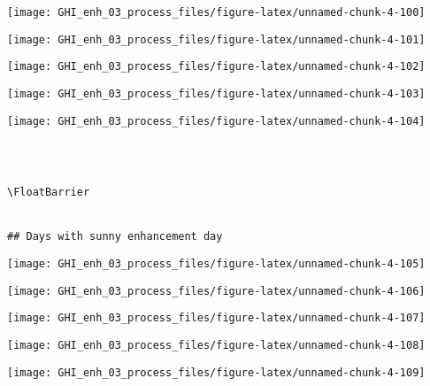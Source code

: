 \documentclass[
  10pt,
  a4paper,oneside]{article}
\begin{document}
\begin{center}\texttt{[image: GHI\_enh\_03\_process\_files/figure-latex/unnamed-chunk-4-100]} \end{center}

\begin{center}\texttt{[image: GHI\_enh\_03\_process\_files/figure-latex/unnamed-chunk-4-101]} \end{center}

\begin{center}\texttt{[image: GHI\_enh\_03\_process\_files/figure-latex/unnamed-chunk-4-102]} \end{center}

\begin{center}\texttt{[image: GHI\_enh\_03\_process\_files/figure-latex/unnamed-chunk-4-103]} \end{center}

\begin{center}\texttt{[image: GHI\_enh\_03\_process\_files/figure-latex/unnamed-chunk-4-104]} \end{center}

\begin{verbatim}
 
 

\FloatBarrier


## Days with sunny enhancement day 
\end{verbatim}

\begin{center}\texttt{[image: GHI\_enh\_03\_process\_files/figure-latex/unnamed-chunk-4-105]} \end{center}

\begin{center}\texttt{[image: GHI\_enh\_03\_process\_files/figure-latex/unnamed-chunk-4-106]} \end{center}

\begin{center}\texttt{[image: GHI\_enh\_03\_process\_files/figure-latex/unnamed-chunk-4-107]} \end{center}

\begin{center}\texttt{[image: GHI\_enh\_03\_process\_files/figure-latex/unnamed-chunk-4-108]} \end{center}

\begin{center}\texttt{[image: GHI\_enh\_03\_process\_files/figure-latex/unnamed-chunk-4-109]} \end{center}
\end{document}
